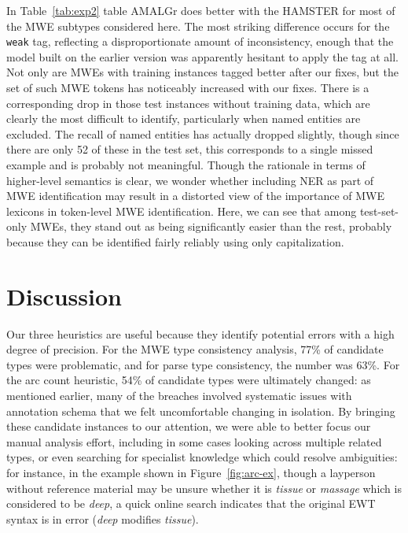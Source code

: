 \documentclass[output=paper
,modfonts
,nonflat]{langsci/langscibook}
\newcommand{\lex}[1]{\textit{#1}\xspace}
\newcommand{\mwetype}[1]{\texttt{#1}\xspace}
\newcommand{\weak}{\mwetype{weak}}
\newcommand{\figureref}[1]{Figure~\ref{#1}\xspace}
\newcommand{\tableref}[1]{Table~\ref{#1}\xspace}
\begin{document}
In \tableref{tab:exp2} table AMALGr does better with the HAMSTER for most of the MWE subtypes considered here. The most striking difference occurs for the \weak tag, reflecting a disproportionate amount of inconsistency, enough that the model built on the earlier version was apparently hesitant to apply the tag at all. Not only are MWEs with training instances tagged better after our fixes, but the set of such MWE tokens has noticeably increased with our fixes. There is a corresponding drop in those test instances without training data, which are clearly the most difficult to identify, particularly when named entities are excluded. The recall of named entities has actually dropped slightly, though since there are only 52 of these in the test set, this corresponds to a single missed example and is probably not meaningful. Though the rationale in terms of higher-level semantics is clear, we wonder whether including NER as part of MWE identification may result in a distorted view of the importance of MWE lexicons in token-level MWE identification. Here, we can see that among test-set-only MWEs, they stand out as being significantly easier than the rest, probably because they can be identified fairly reliably using only capitalization.

\section{Discussion}

Our three heuristics are useful because they identify potential errors with a high degree of precision. For the MWE type consistency analysis, 77\% of candidate types were problematic, and for parse type consistency, the number was 63\%. For the arc count heuristic, 54\% of candidate types were ultimately changed: as mentioned earlier, many of the breaches involved systematic issues with annotation schema that we felt uncomfortable changing in isolation. By bringing these candidate instances to our attention, we were able to better focus our manual analysis effort, including in some cases looking across multiple related types, or even searching for specialist knowledge which could resolve ambiguities: for instance, in the example shown in \figureref{fig:arc-ex}, though a layperson without reference material may be unsure whether it is \lex{tissue} or \lex{massage} which is considered to be \lex{deep}, a quick online search indicates that the original EWT syntax is in error (\lex{deep} modifies \lex{tissue}).
\end{document}
